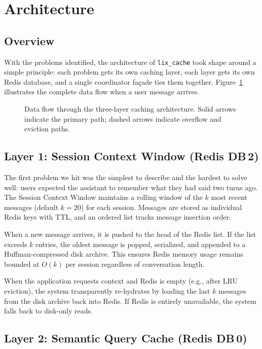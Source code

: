 \documentclass[conference]{IEEEtran}
\begin{document}
\section{Architecture}
\label{sec:architecture}

\subsection{Overview}

With the problems identified, the architecture of \texttt{lix\_cache} took shape around a simple principle: each problem gets its own caching layer, each layer gets its own Redis database, and a single coordinator fa\c{c}ade ties them together. Figure~\ref{fig:architecture} illustrates the complete data flow when a user message arrives.

\begin{figure}[t]
\centering

\caption{Data flow through the three-layer caching architecture. Solid arrows indicate the primary path; dashed arrows indicate overflow and eviction paths.}
\label{fig:architecture}
\end{figure}

\subsection{Layer 1: Session Context Window (Redis DB\,2)}

The first problem we hit was the simplest to describe and the hardest to solve well: users expected the assistant to remember what they had said two turns ago. The Session Context Window maintains a rolling window of the $k$ most recent messages (default $k{=}20$) for each session. Messages are stored as individual Redis keys with TTL, and an ordered list tracks message insertion order.

When a new message arrives, it is pushed to the head of the Redis list. If the list exceeds $k$ entries, the oldest message is popped, serialized, and appended to a Huffman-compressed disk archive. This ensures Redis memory usage remains bounded at $O(k)$ per session regardless of conversation length.

When the application requests context and Redis is empty (e.g., after LRU eviction), the system transparently re-hydrates by loading the last $k$ messages from the disk archive back into Redis. If Redis is entirely unavailable, the system falls back to disk-only reads.

\subsection{Layer 2: Semantic Query Cache (Redis DB\,0)}
\end{document}
